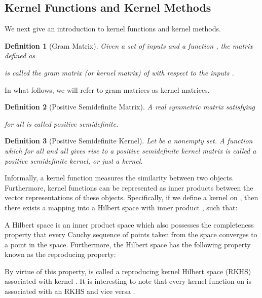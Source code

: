 \documentclass[twoside,11pt]{article}
\newtheorem{definition}{Definition}
\begin{document}
\subsection{Kernel Functions and Kernel Methods}
We next give an introduction to kernel functions and kernel methods.
\begin{definition}[Gram Matrix]
  Given a set of inputs  and a function , the  matrix  defined as
  
  is called the gram matrix (or kernel matrix) of  with respect to the inputs .
\end{definition} 
In what follows, we will refer to gram matrices as kernel matrices.
\begin{definition}[Positive Semidefinite Matrix]
  A real  symmetric matrix  satisfying
  
  for all  is called positive semidefinite.
\end{definition}
\begin{definition}[Positive Semidefinite Kernel]
  Let  be a nonempty set.
  A function  which for all  and all  gives rise to a positive semidefinite kernel matrix is called a positive semidefinite kernel, or just a kernel.
\end{definition} 
Informally, a kernel function 
measures the similarity between two objects. 
Furthermore, kernel functions can be represented as inner products between the vector representations of these objects. 
Specifically, if we define a kernel  on , then there exists a mapping  into a Hilbert space with inner product , such that:

A Hilbert space is an inner product space which also possesses the completeness property that every Cauchy sequence of points taken from the space converges to a point in the space.
Furthermore, the Hilbert space  has the following property known as the reproducing property:

By virtue of this property,  is called a reproducing kernel Hilbert space (RKHS) associated with kernel .
It is interesting to note that every kernel function on  is associated with an RKHS and vice versa \cite{aronszajn1950theory}.
\end{document}
